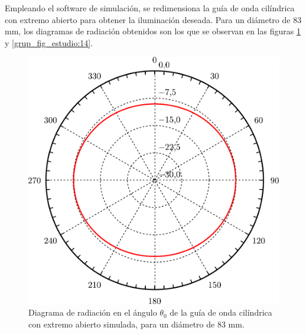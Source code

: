 Empleando el software de simulación, se redimensiona la guía de onda cilíndrica con extremo abierto para obtener la iluminación deseada. Para un diámetro de 83 mm, los diagramas de radiación obtenidos son los que se observan en las figuras \ref{fig_estudio:51} y \ref{grup_fig_estudio:14}.
\begin{figure}[H]
\centering
\includegraphics[scale = 0.5]{Figures/Estudio/estudio_51}
\caption{Diagrama de radiación en el ángulo $\theta_0$ de la guía de onda cilíndrica con extremo abierto simulada, para un diámetro de 83 mm.}
\label{fig_estudio:51}
\end{figure}
